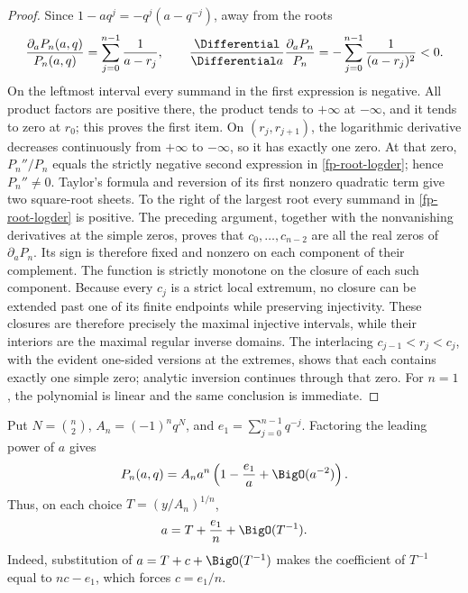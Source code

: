 \begin{proof}
Since \(1-aq^j=-q^j(a-q^{-j})\), away from the roots
\begin{equation}
 \frac{\partial_aP_n(a,q)}{P_n(a,q)}
 =\sum_{j=0}^{n-1}\frac1{a-r_j},
 \qquad
 \frac{\Differential}{\Differential a}\frac{\partial_aP_n}{P_n}
 =-\sum_{j=0}^{n-1}\frac1{(a-r_j)^2}<0.
 \label{fp-root-logder}
\end{equation}
On the leftmost interval every summand in the first expression is negative.
All product factors are positive there, the product tends to \(+\infty\) at
\(-\infty\), and it tends to zero at \(r_0\); this proves the first item.
On \((r_j,r_{j+1})\), the logarithmic derivative decreases continuously from
\(+\infty\) to \(-\infty\), so it has exactly one zero.  At that zero,
\(P_n''/P_n\) equals the strictly negative second expression in
\cref{fp-root-logder}; hence \(P_n''\ne0\).  Taylor's formula and reversion of
its first nonzero quadratic term give two square-root sheets.  To the right of
the largest root every summand in \cref{fp-root-logder} is positive.  The
preceding argument, together with the nonvanishing derivatives at the simple
zeros, proves that \(c_0,\ldots,c_{n-2}\) are all the real zeros of
\(\partial_aP_n\).  Its sign is therefore fixed and nonzero on each component
of their complement.  The function is strictly monotone on the closure of
each such component.  Because every \(c_j\) is a strict local extremum, no
closure can be extended past one of its finite endpoints while preserving
injectivity.  These closures are therefore precisely the maximal injective
intervals, while their interiors are the maximal regular inverse domains.
The interlacing
\(c_{j-1}<r_j<c_j\), with the evident one-sided versions at the extremes,
shows that each contains exactly one simple zero; analytic inversion continues
through that zero.  For \(n=1\), the polynomial is linear and the same
conclusion is immediate.
\end{proof}

Put \(N=\binom n2\), \(A_n=(-1)^nq^N\), and
\(e_1=\sum_{j=0}^{n-1}q^{-j}\).  Factoring the leading power of \(a\) gives
\[
 P_n(a,q)=A_na^n\left(1-\frac{e_1}{a}+\BigO(a^{-2})\right).
\]
Thus, on each choice \(T=(y/A_n)^{1/n}\),
\begin{equation}
 a=T+\frac{e_1}{n}+\BigO(T^{-1}).
 \label{fp-argument-infinity}
\end{equation}
Indeed, substitution of \(a=T+c+\BigO(T^{-1})\) makes the coefficient of
\(T^{-1}\) equal to \(nc-e_1\), which forces \(c=e_1/n\).

